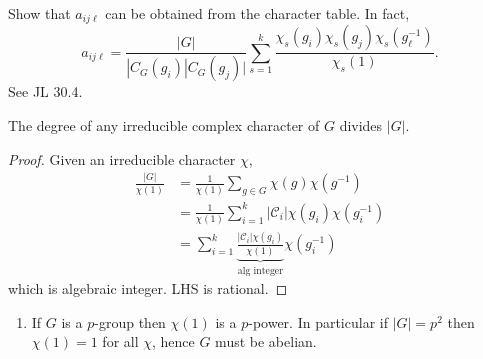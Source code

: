 \documentclass[a4paper]{article}
\newcommand{\ccl}{{\mathcal C}} %
\theoremstyle{definition}
\begin{document}
\begin{ex}
  Show that \(a_{ij\ell}\) can be obtained from the character table. In fact,
  \[
    a_{ij\ell} = \frac{|G|}{|C_G(g_i) |C_G(g_j)|} \sum_{s = 1}^k \frac{\chi_s(g_i) \chi_s(g_j) \chi_s(g_\ell^{-1})}{\chi_s(1)}.
  \]
  See JL 30.4.
\end{ex}

\begin{theorem}
  The degree of any irreducible complex character of \(G\) divides \(|G|\).
\end{theorem}

\begin{proof}
  Given an irreducible character \(\chi\),
  \begin{align*}
    \frac{|G|}{\chi(1)}
    &= \frac{1}{\chi(1)} \sum_{g \in G} \chi(g) \chi(g^{-1}) \\
    &= \frac{1}{\chi(1)} \sum_{i = 1}^k |\ccl_i| \chi(g_i) \chi(g_i^{-1}) \\
    &= \sum_{i = 1}^k \underbrace{\frac{|\ccl_i| \chi(g_i)}{\chi(1)}}_{\text{alg integer}} \chi(g_i^{-1})
  \end{align*}
  which is algebraic integer. LHS is rational.
\end{proof}

\begin{eg}\leavevmode
  \begin{enumerate}
  \item If \(G\) is a \(p\)-group then \(\chi(1)\) is a \(p\)-power. In particular if \(|G| = p^2\) then \(\chi(1) = 1\) for all \(\chi\), hence \(G\) must be abelian.
  \end{enumerate}
\end{eg}



  




\printindex
\end{document}
